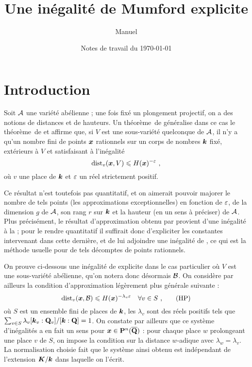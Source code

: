 

\usepackage[colorlinks=true, urlcolor=black, linkcolor=black, citecolor=black,
   pdftex, bookmarks=true, bookmarksnumbered=true]{hyperref}

\newtheorem{thm}{Théorème} \newtheorem{prop}[thm]{Proposition} \newtheorem{lem}[thm]{Lemme} \newtheorem{coro}[thm]{Corollaire} \newtheorem{fait}[thm]{Fait}
\theoremstyle{remark}
\newtheorem*{rem}{Remarque}

\author{Manuel }
\title{Une inégalité de Mumford explicite}
\date{Notes de travail du \today}


\maketitle

\section*{Introduction}

Soit $\mathcal A$ une variété abélienne ; une fois fixé un plongement projectif, on a
des notions de distances et de hauteurs. Un théorème~de 
généralise dans ce cas le théorème~de  et affirme que, si $V$ est
une sous-variété quelconque de $\mathcal A$, il n'y a qu'un nombre fini de points
$\boldsymbol{x}$ rationnels sur un corps de nombres $\boldsymbol{k}$ fixé, extérieurs à $V$ et
satisfaisant à l'inégalité
\[
 \mathrm{dist}_v(\boldsymbol{x}, V) \leqslant H(\boldsymbol{x})^{-\varepsilon} \text{ ,}
\]
où $v$ une place de $\boldsymbol{k}$ et $\varepsilon$ un réel strictement positif.

Ce résultat n'est toutefois pas quantitatif, et on aimerait pouvoir majorer le
nombre de tels points (les approximations exceptionnelles) en fonction de
$\varepsilon$, de la dimension $g$ de $\mathcal A$, son rang $r$ sur $\boldsymbol{k}$ et la hauteur (en
un sens à préciser) de $\mathcal A$. Plus précisément, le résultat d'approximation
obtenu par  provient d'une inégalité à la  ; pour le
rendre quantitatif il suffirait donc d'expliciter les constantes intervenant
dans cette dernière, et de lui adjoindre une inégalité de , ce
qui est la méthode usuelle pour de tels décomptes de points rationnels.

On prouve ci-dessous une inégalité de  explicite dans le cas
particulier où $V$ est une sous-variété abélienne, qu'on notera donc désormais
$\mathcal B$. On considère par ailleurs la condition d'approximation légèrement plus
générale suivante :
\[
 \mathrm{dist}_v(\boldsymbol{x}, \mathcal B) \leqslant H(\boldsymbol{x})^{-\lambda_v\varepsilon} \quad \forall v \in S \text{ ,} \tag{HP} \label{HP}
\]
où $S$ est un ensemble fini de places de $\boldsymbol{k}$, les $\lambda_v$ sont des
réels positifs tels que $\sum_{v \in S} \lambda_v [\boldsymbol{k}_v : \mathbf{Q}_v]/[\boldsymbol{k} : \mathbf{Q}]
= 1$. On constate par ailleurs que ce système d'inégalités a en fait un sens
pour $\boldsymbol{x} \in \mathbf{P}^n(\overline{\mathbf{Q}})$ : pour chaque place $w$ prolongeant une place
$v$ de $S$, on impose la condition sur la distance $w$-adique avec $\lambda_w
= \lambda_v$. La normalisation choisie fait que le système ainsi obtenu est
indépendant de l'extension $\boldsymbol{K}/\boldsymbol{k}$ dans laquelle on l'écrit.

